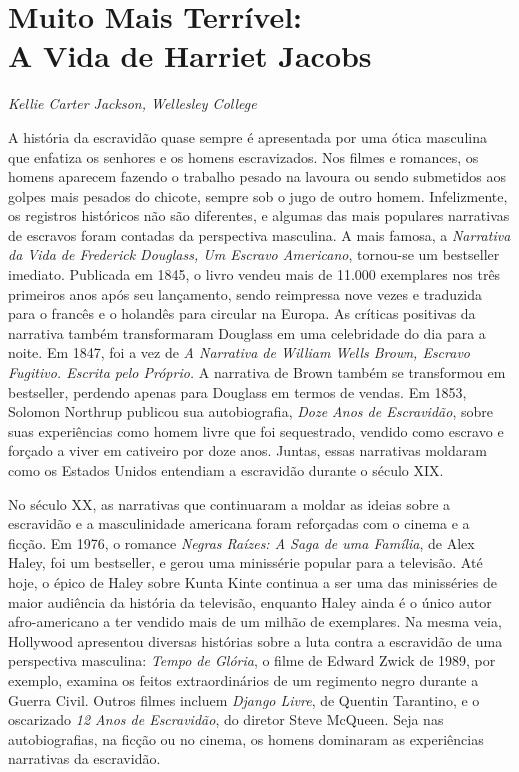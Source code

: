 \chapter{Muito Mais Terrível:\\A Vida de Harriet Jacobs}

\begin{flushright}
\emph{Kellie Carter Jackson, Wellesley College}
\end{flushright}

A história da escravidão quase sempre é apresentada por uma ótica
masculina que enfatiza os senhores e os homens escravizados. Nos filmes
e romances, os homens aparecem fazendo o trabalho pesado na lavoura ou
sendo submetidos aos golpes mais pesados do chicote, sempre sob o jugo
de outro homem. Infelizmente, os registros históricos não são
diferentes, e algumas das mais populares narrativas de escravos foram
contadas da perspectiva masculina. A mais famosa, a \emph{Narrativa da
Vida de Frederick Douglass, Um Escravo Americano}, tornou-se um
bestseller imediato. Publicada em 1845, o livro vendeu mais de 11.000
exemplares nos três primeiros anos após seu lançamento, sendo reimpressa
nove vezes e traduzida para o francês e o holandês para circular na
Europa. As críticas positivas da narrativa também transformaram Douglass
em uma celebridade do dia para a noite. Em 1847, foi a vez de \emph{A
Narrativa de William Wells Brown, Escravo Fugitivo. Escrita pelo
Próprio.} A narrativa de Brown também se transformou em bestseller,
perdendo apenas para Douglass em termos de vendas. Em 1853, Solomon
Northrup publicou sua autobiografia, \emph{Doze Anos de Escravidão},
sobre suas experiências como homem livre que foi sequestrado, vendido
como escravo e forçado a viver em cativeiro por doze anos. Juntas, essas
narrativas moldaram como os Estados Unidos entendiam a escravidão
durante o século XIX.

No século XX, as narrativas que continuaram a moldar as ideias sobre a
escravidão e a masculinidade americana foram reforçadas com o cinema e a
ficção. Em 1976, o romance \emph{Negras Raízes: A Saga de uma Família},
de Alex Haley, foi um bestseller, e gerou uma minissérie popular para a
televisão. Até hoje, o épico de Haley sobre Kunta Kinte continua a ser
uma das minisséries de maior audiência da história da televisão,
enquanto Haley ainda é o único autor afro-americano a ter vendido mais
de um milhão de exemplares. Na mesma veia, Hollywood apresentou diversas
histórias sobre a luta contra a escravidão de uma perspectiva masculina:
\emph{Tempo de Glória}, o filme de Edward Zwick de 1989, por exemplo,
examina os feitos extraordinários de um regimento negro durante a Guerra
Civil. Outros filmes incluem \emph{Django Livre}, de Quentin Tarantino,
e o oscarizado \emph{12 Anos de Escravidão}, do diretor Steve McQueen.
Seja nas autobiografias, na ficção ou no cinema, os homens dominaram as
experiências narrativas da escravidão.

